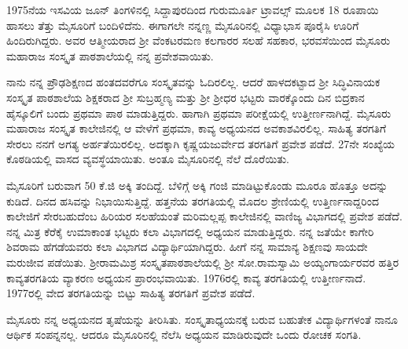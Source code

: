{1975ನೆಯ ಇಸವಿಯ ಜೂನ್ ತಿಂಗಳಿನಲ್ಲಿ ಸಿದ್ದಾಪುರದಿಂದ ಗುರುಮೂರ್ತಿ ಟ್ರಾವಲ್ಸ್ ಮೂಲಕ 18 ರೂಪಾಯಿ ಹಾಸಲು ತೆತ್ತು ಮೈಸೂರಿಗೆ ಬಂದಿಳಿದೆನು. ಈಗಾಗಲೇ ನನ್ನಣ್ಣ ಮೈಸೂರಿನಲ್ಲಿ ವಿಧ್ಯಾಭಾಸ ಪೂರೈಸಿ ಊರಿಗೆ ಹಿಂದಿರುಗಿದ್ದರು.  ಅವರ ಆತ್ಮೀಯರಾದ ಶ್ರೀ ವೆಂಕಟರಮಣ ಕಲಗಾರರ ಸಲಹೆ ಸಹಕಾರ, ಭರವಸೆಯಿಂದ ಮೈಸೂರು ಮಹಾರಾಜ ಸಂಸ್ಕೃತ ಪಾಠಶಾಲೆಯಲ್ಲಿ ನನ್ನ ಪ್ರವೇಶವಾಯಿತು.

ನಾನು ನನ್ನ ಪ್ರೌಢಶಿಕ್ಷಣದ ಹಂತದವರೆಗೂ ಸಂಸ್ಕೃತವನ್ನು ಓದಿರಲಿಲ್ಲ.   ಆದರೆ ಹಾಳದಕಟ್ಟಾದ ಶ್ರೀ ಸಿದ್ಧಿವಿನಾಯಕ ಸಂಸ್ಕೃತ ಪಾಠಶಾಲೆಯ ಶಿಕ್ಷಕರಾದ ಶ್ರೀ ಸುಬ್ರಹ್ಮಣ್ಯ ಮತ್ತು ಶ್ರೀ ಶ್ರೀಧರ ಭಟ್ಟರು ವಾರಕ್ಕೊಂದು ದಿನ ಬಿದ್ರಕಾನ ಹೈಸ್ಕೂಲಿಗೆ ಬಂದು ಪ್ರಥಮಾ ಪಾಠ ಮಾಡುತ್ತಿದ್ದರು.  ಹಾಗಾಗಿ ಪ್ರಥಮಾ ಪರೀಕ್ಷೆಯಲ್ಲಿ ಉತ್ತೀರ್ಣನಾಗಿದ್ದೆ.  ಮೈಸೂರು ಮಹಾರಾಜ ಸಂಸ್ಕೃತ ಕಾಲೇಜಿನಲ್ಲಿ ಆ ವೇಳೆಗೆ ಪ್ರಥಮಾ, ಕಾವ್ಯ ಅಧ್ಯಯನದ ಅವಕಾಶವಿರಲಿಲ್ಲ.  ಸಾಹಿತ್ಯ ತರಗತಿಗೆ ಸೇರಲು ನನಗೆ ಅಗತ್ಯ ಅರ್ಹತೆಯಿರಲಿಲ್ಲ.  ಅದಕ್ಕಾಗಿ ಕೃಷ್ಣಯಜುರ್ವೇದ  ತರಗತಿಗೆ ಪ್ರವೇಶ ಪಡೆದೆ.  27ನೇ ಸಂಖ್ಯೆಯ ಕೊಠಡಿಯಲ್ಲಿ ವಾಸದ ವ್ಯವಸ್ಥೆಯಾಯಿತು. ಅಂತೂ ಮೈಸೂರಿನಲ್ಲಿ ನೆಲೆ ದೊರೆಯಿತು.

ಮೈಸೂರಿಗೆ ಬರುವಾಗ 50 ಕೆ.ಜಿ ಅಕ್ಕಿ ತಂದಿದ್ದೆ.  ಬೆಳಿಗ್ಗೆ ಅಕ್ಕಿ ಗಂಜಿ ಮಾಡಿಟ್ಟುಕೊಂಡು ಮೂರೂ ಹೊತ್ತೂ ಅದನ್ನು ಕುಡಿದೆ. ದಿನದ ಹಸಿವನ್ನು ನಿಭಾಯಿಸುತ್ತಿದ್ದೆ. ಹತ್ತನೆಯ ತರಗತಿಯಲ್ಲಿ ಮೊದಲ ಶ್ರೇಣಿಯಲ್ಲಿ ಉತ್ತಿರ್ಣನಾದ್ದರಿಂದ ಕಾಲೇಜಿಗೆ ಸೇರ\-ಬಹುದೆಂಬ ಹಿರಿಯರ ಸಲಹೆಯಂತೆ ಮರಿಮಲ್ಲಪ್ಪ ಕಾಲೇಜಿನಲ್ಲಿ ವಾಣಿಜ್ಯ ವಿಭಾಗದಲ್ಲಿ ಪ್ರವೇಶ ಪಡೆದೆ.  ನನ್ನ ಮಿತ್ರ ಕೆರೆಕೈ ಉಮಾಕಾಂತ ಭಟ್ಟರು ಕಲಾ ವಿಭಾಗದಲ್ಲಿ ಅಧ್ಯಯನ ಮಾಡುತ್ತಿದ್ದರು.  ನನ್ನ ಜತೆಯೇ ಕಾಗೇರಿ ಶಿವರಾಮ ಹೆಗಡೆಯವರು ಕಲಾ ವಿಭಾಗದ ವಿದ್ಯಾರ್ಥಿಯಾಗಿದ್ದರು.  ಹೀಗೆ ನನ್ನ ಸಾಮಾನ್ಯ ಶಿಕ್ಷಣವು ಸಾಯದೇ ಮರುಜೀವ ಪಡೆಯಿತು.  ಶ್ರೀರಾಮಮಿಶ್ರ ಸಂಸ್ಕೃತಪಾಠಶಾಲೆಯಲ್ಲಿ     ಶ್ರೀ ಸೋ.ರಾಮಸ್ವಾಮಿ \-ಅಯ್ಯಂಗಾರ್ಯರವರ ಹತ್ತಿರ ಕಾವ್ಯತರಗತಿಯ ವ್ಯಾಕರಣ ಅಧ್ಯಯನ ಪ್ರಾರಂಭ\-ವಾಯಿತು. 1976ರಲ್ಲಿ ಕಾವ್ಯ ತರಗತಿಯಲ್ಲಿ ಉತ್ತೀರ್ಣನಾದೆ. 1977ರಲ್ಲಿ ವೇದ ತರಗತಿ\-ಯನ್ನು ಬಿಟ್ಟು ಸಾಹಿತ್ಯ ತರಗತಿಗೆ ಪ್ರವೇಶ ಪಡೆದೆ.

ಮೈಸೂರು ನನ್ನ ಅಧ್ಯಯನದ ತೃಷೆಯನ್ನು ತೀರಿಸಿತು.  ಸಂಸ್ಕೃತಾಧ್ಯಯನಕ್ಕೆ ಬರುವ ಬಹುತೇಕ ವಿದ್ಯಾರ್ಥಿಗಳಂತೆ ನಾನೂ ಆರ್ಥಿಕ ಸಂಪನ್ನನಲ್ಲ.  ಆದರೂ ಮೈಸೂರಿ\-ನಲ್ಲಿ ನೆಲೆಸಿ ಅಧ್ಯಯನ ಮಾಡಿರುವುದೇ ಒಂದು ರೋಚಕ ಸಂಗತಿ. 

}
